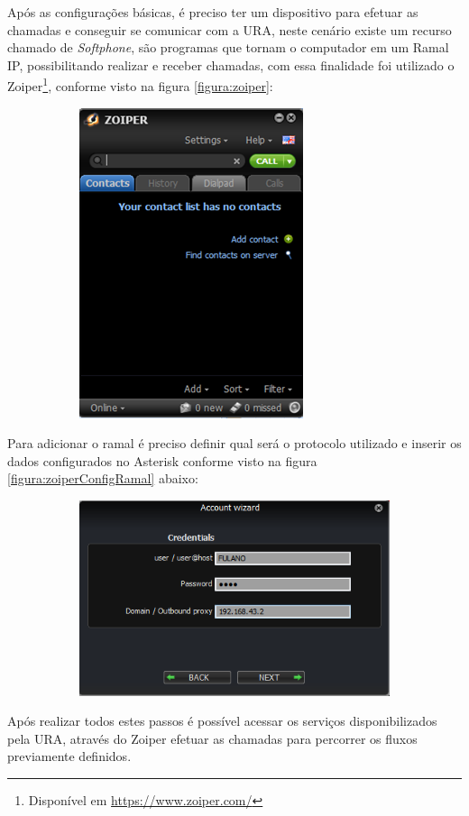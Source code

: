 Após as configurações básicas, é preciso ter um dispositivo para efetuar as chamadas e conseguir se comunicar com a URA, neste cenário existe um recurso chamado de \textit{Softphone}, são programas que tornam o computador em um Ramal IP, possibilitando realizar e receber chamadas, com essa finalidade foi utilizado o Zoiper\footnote{Disponível em \url{https://www.zoiper.com/}}, conforme visto na figura \ref{figura:zoiper}:

\begin{figure}[H]
	\centering
	\caption{Softphone Zoiper sendo executado}	
	\label{figura:zoiper}
	\begin{subfigure}[H]{\textwidth}
		\centering
		\includegraphics{figuras/zoiper.png}
	\end{subfigure}
\end{figure}


Para adicionar o ramal é preciso definir qual será o protocolo utilizado e inserir os dados configurados no Asterisk conforme visto na figura \ref{figura:zoiperConfigRamal} abaixo:

\begin{figure}[H]
	\centering
	\caption{Configurar Ramal no Zoiper}
	\label{figura:zoiperConfigRamal}
	\begin{subfigure}[H]{\textwidth}
		\centering
		\includegraphics{figuras/configurar_ramal_zoiper.png}
	\end{subfigure}
\end{figure}


Após realizar todos estes passos é possível acessar os serviços disponibilizados pela URA, através do Zoiper efetuar as chamadas para percorrer os fluxos previamente definidos.